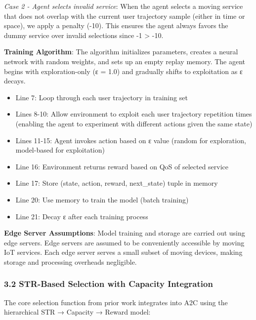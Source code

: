 \documentclass[
  10pt,
  twocolumn,
]{article}
\providecommand{\tightlist}{%
  \setlength{\itemsep}{0pt}\setlength{\parskip}{0pt}}
\begin{document}
\emph{Case 2 - Agent selects invalid service}: When the agent selects a
moving service that does not overlap with the current user trajectory
sample (either in time or space), we apply a penalty (-10). This ensures
the agent always favors the dummy service over invalid selections since
-1 \textgreater{} -10.

\textbf{Training Algorithm}: The algorithm initializes parameters,
creates a neural network with random weights, and sets up an empty
replay memory. The agent begins with exploration-only (ε = 1.0) and
gradually shifts to exploitation as ε decays.

\begin{itemize}
	\tightlist
	\item
	      Line 7: Loop through each user trajectory in training set
	\item
	      Lines 8-10: Allow environment to exploit each user trajectory
	      repetition times (enabling the agent to experiment with different
	      actions given the same state)
	\item
	      Lines 11-15: Agent invokes action based on ε value (random for
	      exploration, model-based for exploitation)
	\item
	      Line 16: Environment returns reward based on QoS of selected service
	\item
	      Line 17: Store (state, action, reward, next\_state) tuple in memory
	\item
	      Line 20: Use memory to train the model (batch training)
	\item
	      Line 21: Decay ε after each training process
\end{itemize}

\textbf{Edge Server Assumptions}: Model training and storage are carried
out using edge servers. Edge servers are assumed to be conveniently
accessible by moving IoT services. Each edge server serves a small
subset of moving devices, making storage and processing overheads
negligible.

\hypertarget{str-based-selection-with-capacity-integration}{%
	\subsubsection{3.2 STR-Based Selection with Capacity
		Integration}\label{str-based-selection-with-capacity-integration}}

The core selection function from prior work integrates into A2C using
the hierarchical STR → Capacity → Reward model:
\end{document}
